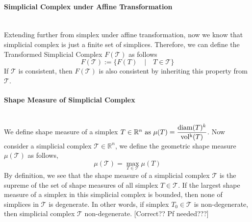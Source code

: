     \paragraph{Simplicial Complex under Affine Transformation}\mbox{}\\
    Extending further from simplex under affine transformation, now we know that simplicial complex is just a finite set of simplices. Therefore, we can define the Transformed Simplicial Complex $F(\mathcal{T})$ as follows
    \begin{equation*}
    F(\mathcal{T}) := \{F(T) \quad \vert \quad T\in \mathcal{T}\}
    \end{equation*}
    If $\mathcal{T}$ is consistent, then $F(\mathcal{T})$ is also consistent by inheriting this property from $\mathcal{T}$.

    \paragraph{Shape Measure of Simplicial Complex}\mbox{}\\
    We define shape measure of a simplex \(T \in\mathbb{R}^n$ as $\mu({{T}}) = \displaystyle \frac{\operatorname{diam}({T})^k}{\operatorname{vol^k}({T})}\). Now consider a simplicial complex $\mathcal{T}\in\mathbb{R}^n$, we define the geometric shape measure $\mu(\mathcal{T})$ as follows,
    \begin{equation*}
    \mu(\mathcal{T}) = \max_{T \in \mathcal{T}} \mu(T)
    \end{equation*}
    By definition, we see that the shape measure of a simplicial complex $\mathcal{T}$ is the supreme of the set of shape measures of all simplex $T\in\mathcal{T}$. If the largest shape measure of a simplex in this simplicial complex is bounded, then none of simplices in $\mathcal{T}$ is degenerate. In other words, if simplex $T_0 \in\mathcal{T}$ is non-degenerate, then simplicial complex $\mathcal{T}$ non-degenerate.
    [Correct?? Pf needed???]